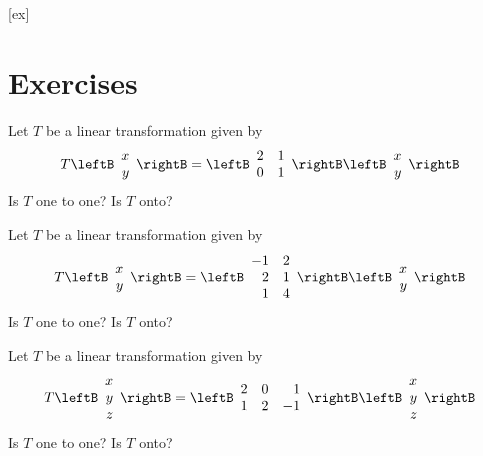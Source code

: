 [ex]
\section*{Exercises}

\begin{enumialphparenastyle}

\begin{ex} Let $T$ be a linear transformation given by 
\[
T \leftB \begin{array}{r}
x\\
y
\end{array}\rightB = \leftB \begin{array}{rr}
2 & 1 \\
0 & 1 
\end{array}\rightB
 \leftB \begin{array}{r}
x\\
y
\end{array}\rightB 
\]
Is $T$ one to one? Is $T$ onto?
\end{ex}

\begin{ex} Let $T$ be a linear transformation given by 
\[
T \leftB \begin{array}{r}
x\\
y
\end{array}\rightB = \leftB \begin{array}{rr}
-1 & 2 \\
2 & 1 \\
1 & 4  
\end{array}\rightB
 \leftB \begin{array}{r}
x\\
y
\end{array}\rightB 
\]
Is $T$ one to one? Is $T$ onto?
\end{ex}

\begin{ex} Let $T$ be a linear transformation given by 
\[
T \leftB \begin{array}{r}
x\\
y  \\
z
\end{array}\rightB = \leftB \begin{array}{rrr}
2 & 0 & 1  \\
1 & 2 & -1
\end{array}\rightB
 \leftB \begin{array}{r}
x\\
y \\
z
\end{array}\rightB 
\]
Is $T$ one to one? Is $T$ onto?
\end{ex}



\end{enumialphparenastyle}
